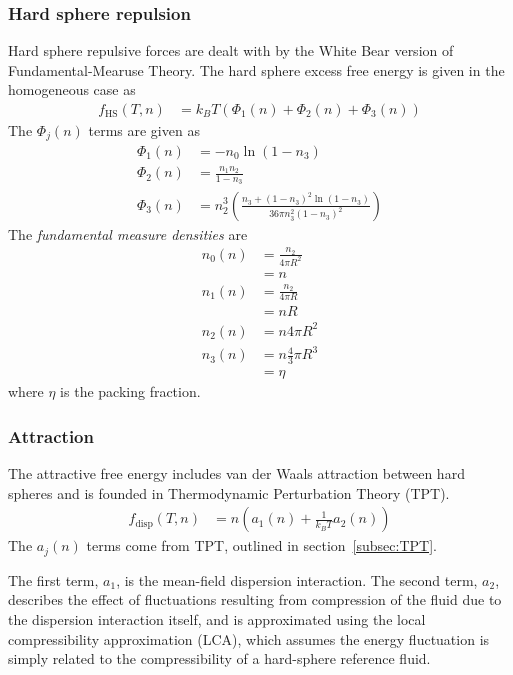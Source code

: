 \documentclass[letterpaper,twocolumn,amsmath,amssymb,prb]{revtex4-1}
\newcommand{\kT}{\ensuremath{k_BT}}
\newcommand{\fhs}{\ensuremath{f_\text{HS}(T,n)}}
\newcommand{\fdisp}{\ensuremath{f_\text{disp}(T,n)}}
\newcommand{\1}{\ensuremath{\textbf{r}_1}}
\newcommand{\2}{\ensuremath{\textbf{r}_2}}
\newcommand{\3}{\ensuremath{\textbf{r}_3}}
\newcommand{\4}{\ensuremath{\textbf{r}_4}}
\begin{document}
\subsubsection{Hard sphere repulsion}\label{sub2sec:HS}
Hard sphere repulsive forces are dealt with by the White Bear version of Fundamental-Mearuse Theory.\cite{Roth02} The hard sphere excess free energy is given in the homogeneous case as
\begin{align}
  \fhs &= \kT\left( \Phi_1(n) + \Phi_2(n) + \Phi_3(n) \right)
\end{align}
The $\Phi_j(n)$ terms are given as
\begin{align}
  \Phi_1(n) &= -n_0\ln(1 - n_3) \\
  \Phi_2(n) &= \frac{n_1n_2}{1 - n_3} \\
  \Phi_3(n) &= n_2^3\left( \frac{n_3 + (1 - n_3)^2\ln(1 - n_3)}{36\pi n_3^2(1 - n_3)^2} \right)
\end{align}
The \emph{fundamental measure densities} are
\begin{align}
  n_0(n) &= \frac{n_2}{4\pi R^2} \nonumber \\
  &= n \\
  n_1(n) &= \frac{n_2}{4\pi R} \nonumber \\
  &= nR \\
  n_2(n) &= n4\pi R^2 \\
  n_3(n) &= n\frac{4}{3}\pi R^3 \nonumber \\
  &= \eta
\end{align}
where $\eta$ is the packing fraction.

\subsubsection{Attraction}\label{sub2sec:disp}
The attractive free energy includes van der Waals attraction between hard spheres and is founded in Thermodynamic Perturbation Theory (TPT).
\begin{align}
  \fdisp &= n \left( a_1(n) + \frac{1}{\kT}a_2(n) \right)
\end{align}
The $a_j(n)$ terms come from TPT, outlined in section~\ref{subsec:TPT}.

The first term, $a_1$, is the mean-field dispersion interaction. The second term, $a_2$, describes the effect of fluctuations resulting from compression of the fluid due to the dispersion interaction itself, and is approximated using the local compressibility approximation (LCA), which assumes the energy fluctuation is simply related to the compressibility of a hard-sphere reference fluid.\cite{Barker76}
\end{document}
